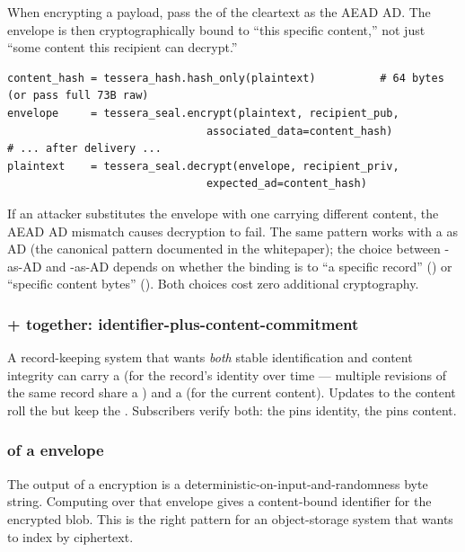 When encrypting a payload, pass the \tesserahash{} of the cleartext as the AEAD AD. The \tesseraseal{} envelope is then cryptographically bound to ``this specific content,'' not just ``some content this recipient can decrypt.''

\begin{lstlisting}[language=Pseudocode]
content_hash = tessera_hash.hash_only(plaintext)          # 64 bytes (or pass full 73B raw)
envelope     = tessera_seal.encrypt(plaintext, recipient_pub,
                               associated_data=content_hash)
# ... after delivery ...
plaintext    = tessera_seal.decrypt(envelope, recipient_priv,
                               expected_ad=content_hash)
\end{lstlisting}

If an attacker substitutes the envelope with one carrying different content, the AEAD AD mismatch causes decryption to fail. The same pattern works with a \tesseraid{} as AD (the canonical pattern documented in the \tesseraseal{} whitepaper); the choice between \tesseraid{}-as-AD and \tesserahash{}-as-AD depends on whether the binding is to ``a specific record'' (\tesseraid{}) or ``specific content bytes'' (\tesserahash{}). Both choices cost zero additional cryptography.

\subsubsection{\tesseraid{} + \tesserahash{} together: identifier-plus-content-commitment}

A record-keeping system that wants \emph{both} stable identification and content integrity can carry a \tesseraid{} (for the record's identity over time --- multiple revisions of the same record share a \tesseraid{}) and a \tesserahash{} (for the current content). Updates to the content roll the \tesserahash{} but keep the \tesseraid{}. Subscribers verify both: the \tesseraid{} pins identity, the \tesserahash{} pins content.

\subsubsection{\tesserahash{} of a \tesseraseal{} envelope}

The output of a \tesseraseal{} encryption is a deterministic-on-input-and-randomness byte string. Computing \tesserahash{} over that envelope gives a content-bound identifier for the encrypted blob. This is the right pattern for an object-storage system that wants to index by ciphertext.

